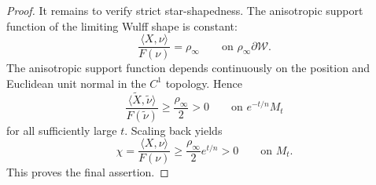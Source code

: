 \documentclass[11pt,reqno]{amsart}
\theoremstyle{definition}
\theoremstyle{remark}
\numberwithin{equation}{section}
\begin{document}
\begin{proof}
It remains to verify strict star-shapedness. The anisotropic support
function of the limiting Wulff shape is constant:
\begin{equation*}
 \frac{\langle X,\nu\rangle}{F(\nu)}=\rho_\infty
 \qquad\text{on }\rho_\infty\partial\mathcal W.
\end{equation*}
The anisotropic support function depends continuously on the position
and Euclidean unit normal in the $C^1$ topology. Hence
\begin{equation*}
 \frac{\langle \widetilde X,\widetilde\nu\rangle}
 {F(\widetilde\nu)}\geq\frac{\rho_\infty}{2}>0
 \qquad\text{on }e^{-t/n}M_t
\end{equation*}
for all sufficiently large $t$. Scaling back yields
\begin{equation*}
 \chi=\frac{\langle X,\nu\rangle}{F(\nu)}
 \geq\frac{\rho_\infty}{2}e^{t/n}>0
 \qquad\text{on }M_t.
\end{equation*}
This proves the final assertion.
\end{proof}
\end{document}
